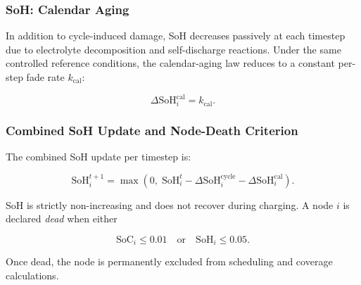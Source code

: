 \documentclass[journal]{IEEEtran}
\begin{document}
\subsubsection{SoH: Calendar Aging}

In addition to cycle-induced damage, SoH decreases passively at each
timestep due to electrolyte decomposition and self-discharge
reactions. Under the same controlled reference conditions, the
calendar-aging law reduces to a constant per-step fade rate
$k_{\text{cal}}$:

\begin{equation}
  \Delta\text{SoH}_i^{\text{cal}} = k_{\text{cal}}.
  \label{eq:soh_cal}
\end{equation}

\subsubsection{Combined SoH Update and Node-Death Criterion}

The combined SoH update per timestep is:

\begin{equation}
  \text{SoH}_i^{t+1} = \max\!\left(0,\;
  \text{SoH}_i^t
  - \Delta\text{SoH}_i^{\text{cycle}}
  - \Delta\text{SoH}_i^{\text{cal}}\right).
  \label{eq:soh_update}
\end{equation}

SoH is strictly non-increasing and does not recover during charging. A
node $i$ is declared \emph{dead} when either

\begin{equation}
  \text{SoC}_i \leq 0.01 \quad \text{or} \quad \text{SoH}_i \leq 0.05.
  \label{eq:death}
\end{equation}

Once dead, the node is permanently excluded from scheduling and coverage
calculations.

\end{document}
